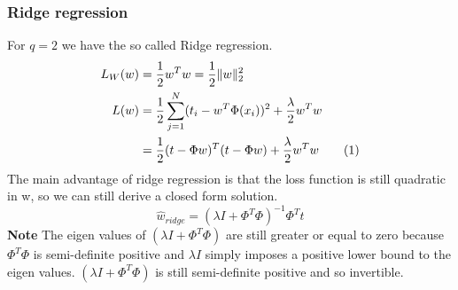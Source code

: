 \documentclass[main.tex]{subfiles}
\newcommand\numberthis{\addtocounter{equation}{1}\tag{\theequation}}
\begin{document}
\subsubsection{Ridge regression}
For $q=2$ we have the so called Ridge regression.
\begin{align*}
    L_W(w)&=\frac{1}{2}w^T w = \frac{1}{2}\| w \|_2^2 \\
    L(w) &= \frac{1}{2}\sum_{j=1}^N(t_i-w^T\Phi(x_i))^2 + \frac{\lambda}{2}w^T w \\
    &=\frac{1}{2}(t-\Phi w)^T(t-\Phi w) + \frac{\lambda}{2}w^T w \numberthis
\end{align*}
The main advantage of ridge regression is that the loss function is still quadratic in w, so we can still derive a closed form solution.
\begin{equation}
    \hat{w}_{ridge}=(\lambda I+\Phi^T \Phi)^{-1}\Phi^T t
\end{equation}
\textbf{Note} The eigen values of $(\lambda I+\Phi^T \Phi)$ are still greater or equal to zero because $\Phi^T \Phi$ is semi-definite positive and $\lambda I$ simply imposes a positive lower bound to the eigen values. $(\lambda I+\Phi^T \Phi)$ is still semi-definite positive and so invertible.
\end{document}
